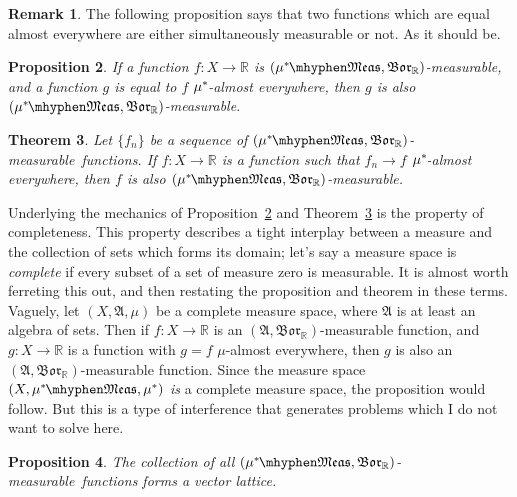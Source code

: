 \documentclass[
twoside=true,
paper=letter,
fontsize=11pt,
pagesize=auto,
leqno,
openany,
headsepline,
overfullrule,
]{scrbook}
\theoremstyle{plain}
\newtheorem{thm}{Theorem}[chapter]
\theoremstyle{plain}
\newtheorem{prop}[thm]{Proposition}
\theoremstyle{definition}
\newtheorem{rmk}[thm]{Remark}
\theoremstyle{bfnoteitalic}
\theoremstyle{bfnoteroman}
\newcommand{\sigalg}[1]{\mathfrak{#1}}
\newcommand{\borel}{\mathfrak{Bor}}
\newcommand{\R}{\mathbb{R}}
\newcommand{\sigmaalgebra}{\sigalg{A}}
\newcommand{\measurable}[1]{{#1}\mhyphen\mathfrak{Meas}}
\newcommand{\kernast}{\ast\kern-1pt}
\newcommand{\mbmeasurable}{$(\measurable{\measure^\kernast},\borel_\R)$\hyp{}measurable}
\newcommand{\function}{f}
\newcommand{\functionii}{g}
\newcommand{\measurespace}{X}
\newcommand{\measure}{\mu}
\begin{document}
\begin{rmk}
The following proposition says that two functions which are equal almost everywhere are either simultaneously measurable or not. As it should be.  
\end{rmk}



\begin{prop}\label{measurable_almost_everywhere}
If a function $\function:\measurespace\to\R$ is \mbmeasurable, and 
a function $\functionii$ is equal to $\function$
$\measure^\kernast$-almost everywhere, then $\functionii$ is also \mbmeasurable. 
\end{prop}




\begin{thm}\label{measurable_limits}
Let $\{f_n\}$ be a sequence of \mbmeasurable\ functions. If $f:\measurespace\to\R$ is a function such that $f_n\to f$ $\measure^\kernast$-almost everywhere, then $f$ is also \mbmeasurable.
\end{thm}




\begin{quoting}
\small
Underlying the mechanics of Proposition~\ref{measurable_almost_everywhere} and Theorem~\ref{measurable_limits} is the property of completeness. This property describes a tight interplay between a measure and the collection of sets which forms its domain; let's say a measure space is \emph{complete} if every subset of a set of measure zero is measurable. It is almost worth ferreting this out, and then restating the proposition and theorem in these terms.   Vaguely, let $(\measurespace, \sigmaalgebra, \measure)$ be a complete measure space, where $\sigmaalgebra$ is at least an algebra of sets. Then if $f:\measurespace\to\R$ is an 
$(\sigmaalgebra,\borel_\R)$\hyp{}measurable function, and $g:\measurespace\to\R$ is a function  with $g = f$ $\measure$\hyp{}almost everywhere, then $g$ is also an 
$(\sigmaalgebra,\borel_\R)$\hyp{}measurable function. Since the measure space 
$(\measurespace, \measurable{\measure^\kernast}, \measure^*)$ \emph{is} a complete measure space, the proposition would follow. But this is a type of interference that generates problems which I do not want to solve here.
\end{quoting}



\begin{prop}
The collection of all \mbmeasurable\ functions forms a vector lattice.
\end{prop}
\end{document}
